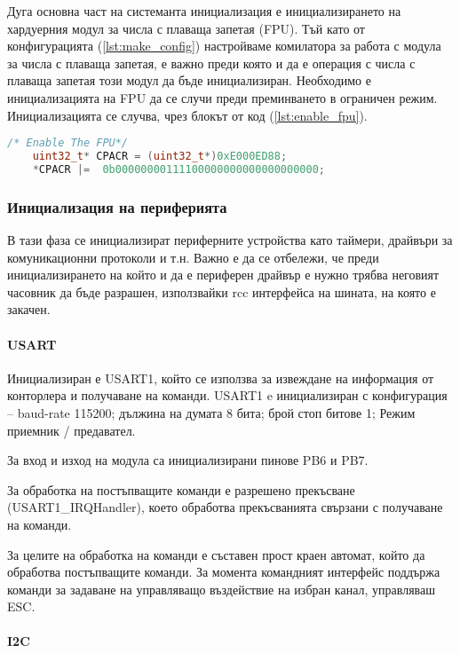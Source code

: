 Дуга основна част на системанта инициализация е инициализирането на хардуерния модул за числа с плаваща запетая (FPU).
Тъй като от конфигурацията (\autoref{lst:make_config}) настройваме комилатора за работа с модула за числа с плаваща запетая, е важно
преди която и да е операция с числа с плаваща запетая този модул да бъде инициализиран.
Необходимо е инициализацията на FPU да се случи преди преминването в ограничен режим.
Инициализацията се случва, чрез блокът от код (\autoref{lst:enable_fpu}).
\begin{lstlisting}[language=c, caption={Инициализация на модула за числа с плаваща запетая}, label={lst:enable_fpu}]
    /* Enable The FPU*/
    uint32_t* CPACR = (uint32_t*)0xE000ED88;
    *CPACR |=  0b00000000111100000000000000000000;
\end{lstlisting}

\subsubsection{Инициализация на периферията}

В тази фаза се инициализират периферните устройства като таймери, драйвъри за комуникационни протоколи и т.н.
Важно е да се отбележи, че преди инициализирането на който и да е периферен драйвър е нужно трябва неговият часовник да бъде разрашен,
използвайки rcc интерфейса на шината, на която е закачен.

\paragraph{USART}

Инициализиран е USART1, 
който се използва за извеждане на информация от 
конторлера и получаване на команди.
USART1 e инициализиран с конфигурация -- 
baud-rate 115200; 
дължина на думата 8 бита;
брой стоп битове 1;
Режим приемник / предавател.

За вход и изход на модула са инициализирани пинове PB6 и PB7.

За обработка на постъпващите команди е разрешено прекъсване (USART1\_IRQHandler),
което обработва прекъсванията свързани с получаване на команди.

За целите на обработка на команди е съставен прост краен автомат, който 
да обработва постъпващите команди.
За момента командният интерфейс поддържа команди за задаване на
управляващо въздействие на избран канал, управляваш ESC.

\paragraph{I2C}

